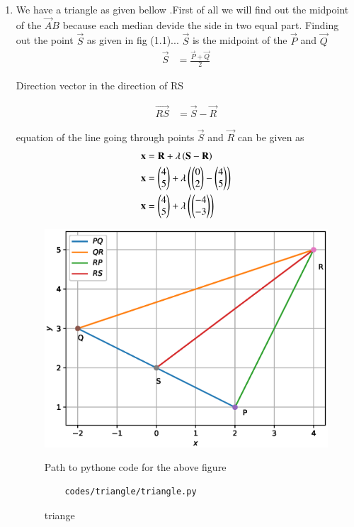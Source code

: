 \renewcommand{\theequation}{\theenumi}
\begin{enumerate}[label=\arabic*.,ref=\thesubsection.\theenumi]
\item We have a triangle as given bellow .First of all we will find out the midpoint of the $\vec AB$ because each median devide the side in two equal part.
 Finding out the point $\vec S $ as given in fig (1.1)...
$\vec S$ is the midpoint of the $\vec P$ and $\vec Q$
\begin{align}
	\vec S &= \frac{\vec P + \vec Q}{2}
\end{align}

Direction vector in the direction of RS

\begin{align}
	\vec {RS}&= \vec{S}  - \vec {R}
\end{align}

  equation of the line going through points $\vec{S}$ and $\vec {R}$ can be given as 
\begin{align}
	\mathbf {x} &= \mathbf {R} + \lambda \left(\mathbf{S}- \mathbf{R}\right)
	\\
	\mathbf {x} &= \begin{pmatrix}4\\5\end{pmatrix} + \lambda \left(\begin{pmatrix}0\\2\end{pmatrix} - \begin{pmatrix}4\\5\end{pmatrix}\right)
	\\
	\mathbf {x} &= \begin{pmatrix}4\\5\end{pmatrix} + \lambda \left(\begin{pmatrix}-4\\-3\end{pmatrix}\right)
\end{align}
\begin{figure}[!ht]
	\centering
	\includegraphics[width=\columnwidth]{./figures/triangle/triangle.eps}
	\caption{triange}
	\label{fig:angle_py}
	Path to pythone code for the above figure
	\begin{lstlisting}
	codes/triangle/triangle.py
	\end{lstlisting}
\end{figure}
\end{enumerate}